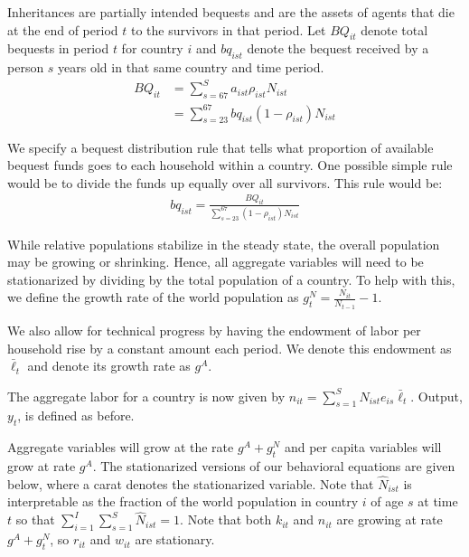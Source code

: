 \documentclass[letterpaper,12pt]{article}
\theoremstyle{definition}
\numberwithin{equation}{section}
\begin{document}
\begin{spacing}{1.5}
	Inheritances are partially intended bequests and are the assets of agents that die at the end of period $t$ to the survivors in that period.  Let $BQ_{it}$ denote total bequests in period $t$ for country $i$ and $bq_{ist}$ denote the bequest received by a person $s$ years old in that same country and time period.
	\begin{align}
		BQ_{it} & = \sum_{s=67}^S a_{ist} \rho_{ist} N_{ist} \\
		& = \sum_{s=23}^{67} bq_{ist} (1-\rho_{ist}) N_{ist}
	\end{align}

	We specify a bequest distribution rule that tells what proportion of available bequest funds goes to each household within a country.  One possible simple rule would be to divide the funds up equally over all survivors.  This rule would be:
	\begin{align}
		bq_{ist} = \frac{BQ_{it}}{\sum_{s=23}^{67} (1-\rho_{ist}) N_{ist}} \nonumber
	\end{align}

	While relative populations stabilize in the steady state, the overall population may be growing or shrinking.  Hence, all aggregate variables will need to be stationarized by dividing by the total population of a country.  To help with this, we define the growth rate of the world population as $g^N_t = \tfrac{N_{it}}{N_{t-1}}-1$.

	We also allow for technical progress by having the endowment of labor per household rise by a constant amount each period.  We denote this endowment as $\bar \ell_t$ and denote its growth rate as $g^A$.

	The aggregate labor for a country is now given by $n_{it} = \sum_{s=1}^S N_{ist} e_{is} \bar \ell_t$.  Output, $y_t$, is defined as before. 

	Aggregate variables will grow at the rate $g^A+g^N_t$ and per capita variables will grow at rate $g^A$.  The stationarized versions of our behavioral equations are given below, where a carat denotes the stationarized variable.  Note that $\hat N_{ist}$ is interpretable as the fraction of the world population in country $i$ of age $s$ at time $t$ so that $\sum_{i=1}^I \sum_{s=1}^S \hat N_{ist} = 1$.  Note that both $k_{it}$ and $n_{it}$ are growing at rate $g^A+g^N_t$, so $r_{it}$ and $w_{it}$ are stationary.


\end{spacing}
\end{document}
